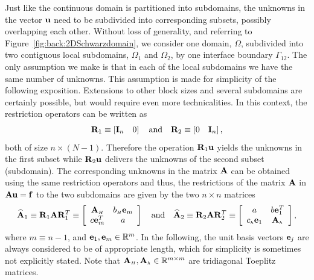 Just like the continuous domain is partitioned into subdomains, the unknowns in the vector $\mathbf{u}$ need to be subdivided into corresponding subsets, possibly overlapping each other. Without loss of generality, and referring to Figure~\ref{fig:back:2DSchwarzdomain}, %
we consider one domain, $\Omega$, subdivided into two contiguous local subdomains, $\Omega_1$ and $\Omega_2$, by one interface boundary $\Gamma_{12}$. The only assumption we make is that in each of the local subdomains we have the same number of unknowns. This assumption is made for simplicity of the following exposition. Extensions to other block sizes and several subdomains are certainly possible, but would require even more technicalities. In this context, the restriction operators can be written as
%
$$\mathbf{R}_1\equiv \left[\mathbf{I}_{n}\quad 0 \right]\quad\mbox{and}\quad \mathbf{R}_2\equiv \left[0\quad  \mathbf{I}_{n} \right],$$
%
both of size $n\times (N-1)$.
Therefore the operation $\mathbf{R}_1\mathbf{u}$ yields the
unknowns in the first subset while $\mathbf{R}_2\mathbf{u}$ delivers the unknowns of the second
subset (subdomain). The corresponding unknowns in the matrix $\mathbf{A}$ can be
obtained using the same restriction operators and thus, the restrictions of the
matrix $\mathbf{A}$ in $\mathbf{A}\mathbf{u}=\mathbf{f}$ to the two subdomains are given by the two $n\times n$
matrices
%
\begin{equation}\label{eq:back:local_prob}
\widehat{\mathbf{A}}_1 \equiv \mathbf{R}_1\mathbf{A}\mathbf{R}_1^T \equiv
\left[\begin{array}{cc}
\mathbf{A}_{\scriptscriptstyle H} &b_{\scriptscriptstyle H}  \mathbf{e}_{m }\\
c \mathbf{e}_{m}^T& a
\end{array}\right]
\quad\mbox{and}\quad
\widehat{\mathbf{A}}_2\equiv \mathbf{R}_2\mathbf{A}\mathbf{R}_2^T\equiv
\left[\begin{array}{cc}
a &b \mathbf{e}_{1}^T\\
c_{\scriptscriptstyle h} \mathbf{e}_{1}& \mathbf{A}_{\scriptscriptstyle h}
\end{array}\right],
\end{equation}
%
where $m\equiv n-1$, and $\mathbf{e}_1,\mathbf{e}_m\in {\mathbb R}^m$. In the following, the
unit basis vectors $\mathbf{e}_j$ are always considered to be of appropriate length,
which for simplicity is sometimes not explicitly stated. Note that
$\mathbf{A}_{\scriptscriptstyle H}, \mathbf{A}_{\scriptscriptstyle h}\in \mathbb{R}^{m\times m}$ are tridiagonal Toeplitz matrices.
